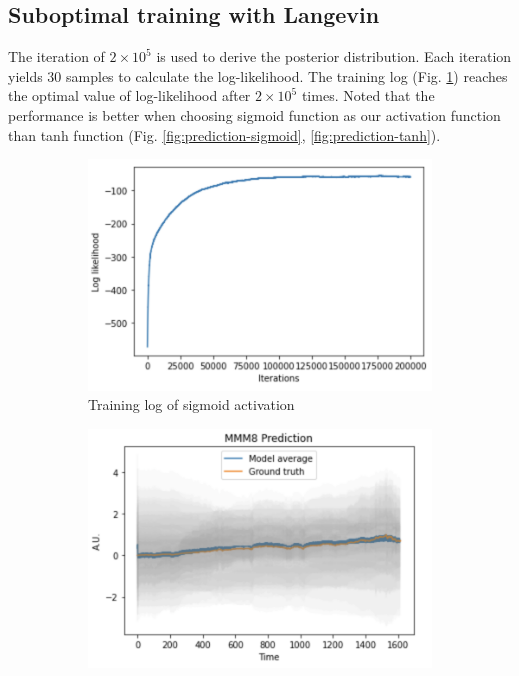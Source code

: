 \documentclass{article}
\begin{document}
\subsection{Suboptimal training with Langevin}

The iteration of $2\times 10^5$ is used to derive the posterior distribution. Each iteration yields $30$ samples to calculate the log-likelihood. The training log (Fig. \ref{fig:training-log-lagevin}) reaches the optimal value of log-likelihood after $2\times 10^5$ times. Noted that the performance is better when choosing sigmoid function as our activation function than tanh function (Fig. \ref{fig:prediction-sigmoid}, \ref{fig:prediction-tanh}).

\begin{figure}[H]
    \centering
    \begin{subfigure}[b]{0.5\textwidth}
        \centering
        \includegraphics[width=\textwidth]{../img/training_Langevin_200000_iter.png}
        \caption{Training log of sigmoid activation}
        \label{fig:training-log-lagevin}
    \end{subfigure}\hfill
    \begin{subfigure}[b]{0.5\textwidth}
        \centering
        \includegraphics[trim={0 0 0 0.7cm}, clip, width=\textwidth]{../img/prediction_Langevin_200000_iter.png}

\end{subfigure}
\end{figure}
\end{document}
